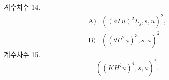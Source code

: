 
\noindent 계수차수 14.
\[
\begin{array}{rl}
\text{A)}&((aLu)^2L_j,s,u)^2,\\[0.25em]
\text{B)}&((\theta H^2u)^3,s,u)^2.
\end{array}
\]
\noindent 계수차수 15.
\[
 ((KH^2u)^4,s,u)^2.
\]
